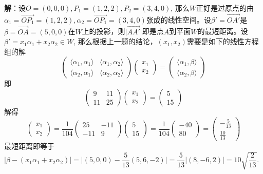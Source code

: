 \newpageorvspace

{\bf 解}：设$O = (0,0,0), P_1 = (1,2,2), P_2 = (3,4,0)$, 那么$W$正好是过原点的由$\alpha_1 = \overrightarrow{OP_1} = (1,2,2), \alpha_2 = \overrightarrow{OP_1} = (3,4,0)$张成的线性空间。设$\beta' = \overrightarrow{OA'}$是$\beta = \overrightarrow{OA} = (5,0,0)$在$W$上的投影，则$\lvert \overrightarrow{AA'} \rvert$即是点$A$到平面$W$的最短距离。设$\beta' = x_1 \alpha_1 + x_2 \alpha_2 \in W$, 那么根据上一题的结论，$(x_1, x_2)$需要是如下的线性方程组的解
$$
\begin{pmatrix}
\langle \alpha_1, \alpha_1 \rangle & \langle \alpha_1, \alpha_2 \rangle \\
\langle \alpha_2, \alpha_1 \rangle & \langle \alpha_2, \alpha_2 \rangle
\end{pmatrix}
\begin{pmatrix}
x_1 \\ x_2
\end{pmatrix} = 
\begin{pmatrix}
\langle \alpha_1, \beta \rangle \\
\langle \alpha_2, \beta \rangle
\end{pmatrix}
$$
即
$$
\begin{pmatrix}
9 & 11 \\ 11 & 25
\end{pmatrix}
\begin{pmatrix}
x_1 \\ x_2
\end{pmatrix} = 
\begin{pmatrix}
5 \\ 15
\end{pmatrix}
$$
解得
$$
\begin{pmatrix}
x_1 \\ x_2
\end{pmatrix} = \dfrac{1}{104} \begin{pmatrix}
25 & -11 \\ -11 & 9
\end{pmatrix}
\begin{pmatrix}
5 \\ 15
\end{pmatrix} = \dfrac{1}{104} \begin{pmatrix}
-40 \\ 80
\end{pmatrix} = \begin{pmatrix}
-\frac{5}{13} \\ \frac{10}{13}
\end{pmatrix}
$$
最短距离即等于$\lvert \beta - (x_1\alpha_1 + x_2\alpha_2) \rvert = \lvert (5,0,0) - \dfrac{5}{13} (5,6,-2) \rvert = \dfrac{5}{13} \lvert (8,-6,2) \rvert = 10 \sqrt{\dfrac{2}{13}}$.

